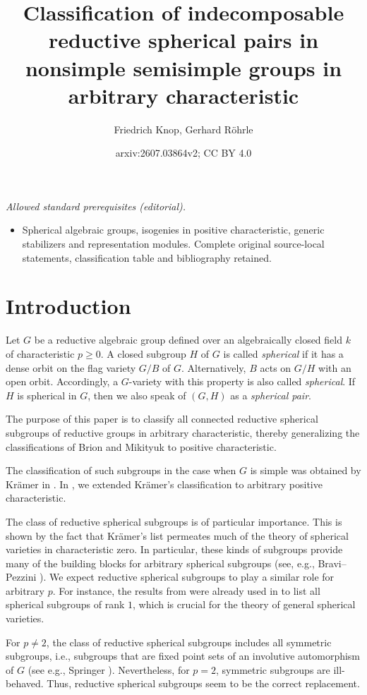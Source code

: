 \documentclass[12pt]{amsart}
\title{Classification of indecomposable reductive spherical pairs in nonsimple semisimple groups in arbitrary characteristic}
\author{Friedrich Knop, Gerhard Röhrle}
\date{arxiv:2607.03864v2; CC BY 4.0}
\numberwithin{equation}{section}
\theoremstyle{definition}
\begin{document}
\maketitle
\noindent\textit{Allowed standard prerequisites (editorial).}\begin{itemize}
\item Spherical algebraic groups, isogenies in positive characteristic, generic stabilizers and representation modules. Complete original source-local statements, classification table and bibliography retained.
\end{itemize}\medskip
\section{Introduction}

Let $G$ be a reductive algebraic group defined over an algebraically
closed field $k$ of characteristic $p\geqslant0$.  A closed subgroup $H$ of
$G$ is called \emph{spherical} if it has a dense orbit on the
flag variety $G/B$ of $G$.  Alternatively, $B$ acts on $G/H$ with an
open orbit.  Accordingly, a $G$-variety with this property is
also called \emph{spherical}.  If $H$ is spherical in $G$, then we
also speak of $(G,H)$ as a \emph{spherical pair}.
 
The purpose of this paper is to classify all connected reductive
spherical subgroups of reductive groups in arbitrary
characteristic, thereby generalizing the classifications of Brion
\cite{Bri87} and Mikityuk \cite[\S 5]{mik} to positive characteristic.

The classification of such subgroups in the case when $G$ is simple
was obtained by Krämer in \cite{Kr}.  In \cite{KR}, we extended
Krämer's classification to arbitrary positive characteristic.

The class of reductive spherical subgroups is of particular
importance. This is shown by the fact that Krämer's list permeates
much of the theory of spherical varieties in characteristic zero. In
particular, these kinds of subgroups provide many of the building
blocks for arbitrary spherical subgroups (see, e.g., Bravi--Pezzini
\cite{BrPezz}). We expect reductive spherical subgroups to play a
similar role for arbitrary $p$. For instance, the results from
\cite{KR} were already used in \cite{Knop5} to list all spherical
subgroups of rank $1$, which is crucial for the theory of general
spherical varieties.

For $p\ne2$, the class of reductive spherical subgroups includes all
symmetric subgroups, i.e., subgroups that are fixed point sets of an
involutive automorphism of $G$ (see e.g., Springer \cite{springer}).
Nevertheless, for $p=2$, symmetric subgroups are ill-behaved. Thus,
reductive spherical subgroups seem to be the correct replacement.
\end{document}
